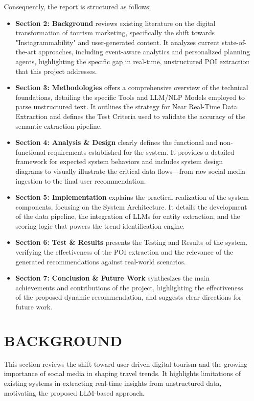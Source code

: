 \documentclass[a4paper,12pt]{report}
\begin{document}
Consequently, the report is structured as follows:
\begin{itemize}
\item \textbf{Section 2: Background} reviews existing literature on the digital transformation of tourism marketing, specifically the shift towards "Instagrammability" and user-generated content. It analyzes current state-of-the-art approaches, including event-aware analytics and personalized planning agents, highlighting the specific gap in real-time, unstructured POI extraction that this project addresses.
\item \textbf{Section 3: Methodologies} offers a comprehensive overview of the technical foundations, detailing the specific Tools and LLM/NLP Models employed to parse unstructured text. It outlines the strategy for Near Real-Time Data Extraction and defines the Test Criteria used to validate the accuracy of the semantic extraction pipeline.
\item \textbf{Section 4: Analysis \& Design} clearly defines the functional and non-functional requirements established for the system. It provides a detailed framework for expected system behaviors and includes system design diagrams to visually illustrate the critical data flows—from raw social media ingestion to the final user recommendation.
\item \textbf{Section 5: Implementation} explains the practical realization of the system components, focusing on the System Architecture. It details the development of the data pipeline, the integration of LLMs for entity extraction, and the scoring logic that powers the trend identification engine.
\item \textbf{Section 6: Test \& Results} presents the Testing and Results of the system, verifying the effectiveness of the POI extraction and the relevance of the generated recommendations against real-world scenarios.
\item \textbf{Section 7: Conclusion \& Future Work} synthesizes the main achievements and contributions of the project, highlighting the effectiveness of the proposed dynamic recommendation, and suggests clear directions for future work.
\end{itemize}

\chapter{BACKGROUND}

This section reviews the shift toward user-driven digital tourism and the growing importance of social media in shaping travel trends. It highlights limitations of existing systems in extracting real-time insights from unstructured data, motivating the proposed LLM-based approach.
\end{document}
